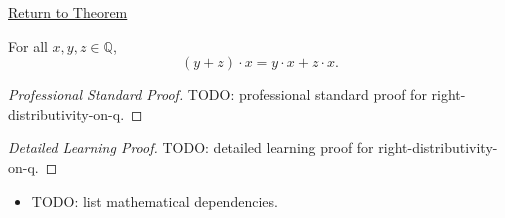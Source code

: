 \newpage
{}
\label{prf:right-distributivity-on-q}

\begin{remark*}[Return]
\hyperref[cor:right-distributivity-on-q]{Return to Theorem}
\end{remark*}

\begin{corollary*}
For all $x,y,z\in\mathbb{Q}$,
\[
(y+z)\cdot x=y\cdot x+z\cdot x.
\]
\end{corollary*}

\begin{proof}[Professional Standard Proof]
\LRAProofBodyStart
TODO: professional standard proof for right-distributivity-on-q.
\end{proof}

\begin{proof}[Detailed Learning Proof]
\LRAProofBodyStart
TODO: detailed learning proof for right-distributivity-on-q.
\end{proof}

\begin{remark*}
\end{remark*}

\begin{dependencies}
\begin{itemize}
  \item TODO: list mathematical dependencies.
\end{itemize}
\end{dependencies}

\clearpage

